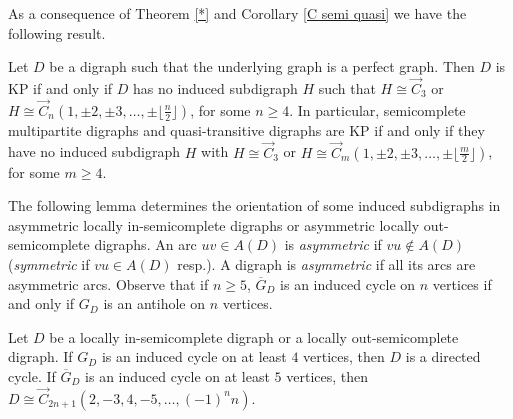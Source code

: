 As a consequence of Theorem \ref{*} and Corollary \ref{C semi quasi} we have the following result.
\begin{teo}\label{*KP}
Let $D$ be a digraph such that the underlying graph %
is a perfect graph. Then $D$ is KP if and only if $D$ has no induced subdigraph $H$ such that $H\cong\overrightarrow{C}_3$ or $H\cong \overrightarrow{C}_n(1,\pm2,\pm3,\dots,\pm\lfloor \frac{n}{2}\rfloor)$, for some $n\ge4$. In particular, semicomplete multipartite digraphs and  quasi-transitive digraphs are KP if and only if they have no induced subdigraph $H$ with $H\cong \overrightarrow{C}_3$ or
$H\cong\overrightarrow{C}_{m}(1,\pm 2,\pm 3,\dots,\pm \lfloor \frac{m}{2} \rfloor )$, for some $m\ge4$.
\end{teo}


The following lemma determines the orientation of some induced subdigraphs in asymmetric locally in-semicomplete digraphs or asymmetric locally out-semicomplete digraphs. 
An arc ${uv\in A(D)}$ is \emph{asymmetric} if $vu\notin A(D)$ (\emph{symmetric} if $vu\in A(D)$ resp.). A digraph is \emph{asymmetric} if all its arcs are asymmetric arcs.
Observe that if $n\ge 5$, $\overline{G}_D$ is an induced cycle on $n$ vertices if and only if $G_D$ is an antihole on $n$ vertices.

\begin{lem}\label{semi ciclo}
Let $D$ be a locally in-semicomplete digraph or a locally out-semicomplete digraph. If $G_D$ is an induced cycle on at least $4$ vertices, then $D$ is a directed cycle. If $\overline{G}_D$ is an induced cycle on at least $5$ vertices, then $D\cong \overrightarrow{C}_{2n+1}(2,-3,4,-5,\dots, (-1)^nn)$.
\end{lem}

